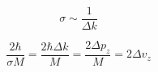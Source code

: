 \documentclass[a4paper,14pt]{book}
\begin{document}

\begin{equation}
\nonumber
\sigma \sim \frac{1}{\Delta k}
\end{equation}

\begin{equation}
\nonumber
\frac{2 \hbar}{\sigma M} = \frac{2 \hbar \Delta k}{M} = \frac{2 \Delta p_z}{M} = 2 \Delta v_z
\end{equation}

\end{document}
